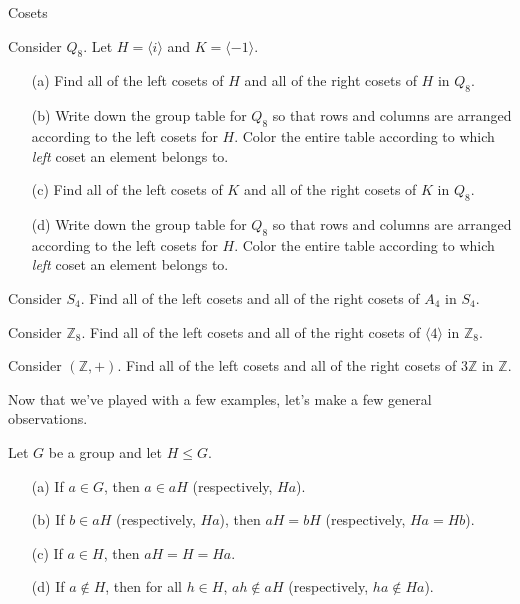 \begin{section}{Cosets}
\begin{exercise}
Consider $Q_8$.  Let $H=\langle i\rangle$ and $K=\langle -1\rangle$.
\begin{enumerate}
\item[(a)] Find all of the left cosets of $H$ and all of the right cosets of $H$ in $Q_8$.  
\item[(b)] Write down the group table for $Q_8$ so that rows and columns are arranged according to the left cosets for $H$.  Color the entire table according to which \emph{left} coset an element belongs to.
\item[(c)] Find all of the left cosets of $K$ and all of the right cosets of $K$ in $Q_8$.
\item[(d)] Write down the group table for $Q_8$ so that rows and columns are arranged according to the left cosets for $H$.  Color the entire table according to which \emph{left} coset an element belongs to.
\end{enumerate}
\end{exercise}

\begin{exercise}
Consider $S_4$.  Find all of the left cosets and all of the right cosets of $A_4$ in $S_4$.
\end{exercise}

\begin{exercise}
Consider $\mathbb{Z}_8$.  Find all of the left cosets and all of the right cosets of $\langle 4\rangle$ in $\mathbb{Z}_8$.
\end{exercise}

\begin{exercise}
Consider $(\mathbb{Z},+)$.  Find all of the left cosets and all of the right cosets of $3\mathbb{Z}$ in $\mathbb{Z}$.
\end{exercise}

Now that we've played with a few examples, let's make a few general observations.

\begin{theorem}
Let $G$ be a group and let $H\leq G$.
\begin{enumerate}
\item[(a)] If $a\in G$, then $a\in aH$ (respectively, $Ha$).
\item[(b)] \label{thm:coset_representative} If $b\in aH$ (respectively, $Ha$), then $aH=bH$ (respectively, $Ha=Hb$).
\item[(c)] If $a\in H$, then $aH=H=Ha$.
\item[(d)] If $a\notin H$, then for all $h\in H$, $ah\notin aH$ (respectively, $ha \notin Ha$).
\end{enumerate}
\end{theorem}


\end{section}
